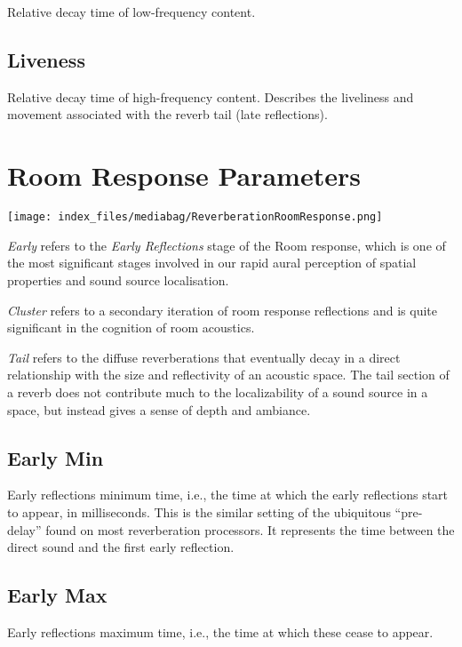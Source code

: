 \documentclass[
  letterpaper,
  DIV=11,
  numbers=noendperiod]{scrreport}
\begin{document}
Relative decay time of low-frequency content.

\hypertarget{liveness}{%
\subsection{Liveness}\label{liveness}}

Relative decay time of high-frequency content. Describes the liveliness
and movement associated with the reverb tail (late reflections).

\hypertarget{room-response-parameters}{%
\section{Room Response Parameters}\label{room-response-parameters}}

\texttt{[image: index\_files/mediabag/ReverberationRoomResponse.png]}

\emph{Early} refers to the \emph{Early Reflections} stage of the Room
response, which is one of the most significant stages involved in our
rapid aural perception of spatial properties and sound source
localisation.

\emph{Cluster} refers to a secondary iteration of room response
reflections and is quite significant in the cognition of room acoustics.

\emph{Tail} refers to the diffuse reverberations that eventually decay
in a direct relationship with the size and reflectivity of an acoustic
space. The tail section of a reverb does not contribute much to the
localizability of a sound source in a space, but instead gives a sense
of depth and ambiance.

\hypertarget{early-min}{%
\subsection{Early Min}\label{early-min}}

Early reflections minimum time, i.e., the time at which the early
reflections start to appear, in milliseconds. This is the similar
setting of the ubiquitous ``pre-delay'' found on most reverberation
processors. It represents the time between the direct sound and the
first early reflection.

\hypertarget{early-max}{%
\subsection{Early Max}\label{early-max}}

Early reflections maximum time, i.e., the time at which these cease to
appear.
\end{document}
